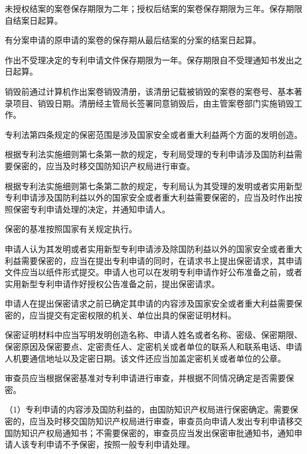 未授权结案的案卷保存期限为二年；授权后结案的案卷保存期限为三年。保存期限自结案日起算。

有分案申请的原申请的案卷的保存期从最后结案的分案的结案日起算。

作出不受理决定的专利申请文件保存期限为一年。保存期限自不受理通知书发出之日起算。

销毁前通过计算机作出案卷销毁清册，该清册记载被销毁的案卷的案卷号、基本著录项目、销毁日期。清册经主管局长签署同意销毁后，由主管案卷部门实施销毁工作。

专利法第四条规定的保密范围是涉及国家安全或者重大利益两个方面的发明创造。

根据专利法实施细则第七条第一款的规定，专利局受理的专利申请涉及国防利益需要保密的，应当及时移交国防知识产权局进行审查。

根据专利法实施细则第七条第二款的规定，专利局认为其受理的发明或者实用新型专利申请涉及国防利益以外的国家安全或者重大利益需要保密的，应当及时作出按照保密专利申请处理的决定，并通知申请人。

保密的基准按照国家有关规定执行。

申请人认为其发明或者实用新型专利申请涉及除国防利益以外的国家安全或者重大利益需要保密的，应当在提出专利申请的同时，在请求书上提出保密请求，其申请文件应当以纸件形式提交。申请人也可以在发明专利申请作好公布准备之前，或者实用新型专利申请作好授权公告准备之前，提出保密请求。

申请人在提出保密请求之前已确定其申请的内容涉及国家安全或者重大利益需要保密的，应当提交有定密权限的机关、单位出具的保密证明材料。

保密证明材料中应当写明发明创造名称、申请人姓名或者名称、密级、保密期限、保密原因及保密要点、定密责任人、定密机关或者单位的联系人和联系电话、申请人机要通信地址以及定密日期。该文件还应当加盖定密机关或者单位的公章。

审查员应当根据保密基准对专利申请进行审查，并根据不同情况确定是否需要保密。

{\setlength{\parindent}{17.1bp}（1）专利申请的内容涉及国防利益的，由国防知识产权局进行保密确定。需要保密的，应当及时移交国防知识产权局进行审查，审查员向申请人发出专利申请移交国防知识产权局通知书；不需要保密的，审查员应当发出保密审批通知书，通知申请人该专利申请不予保密，按照一般专利申请处理。\par}

